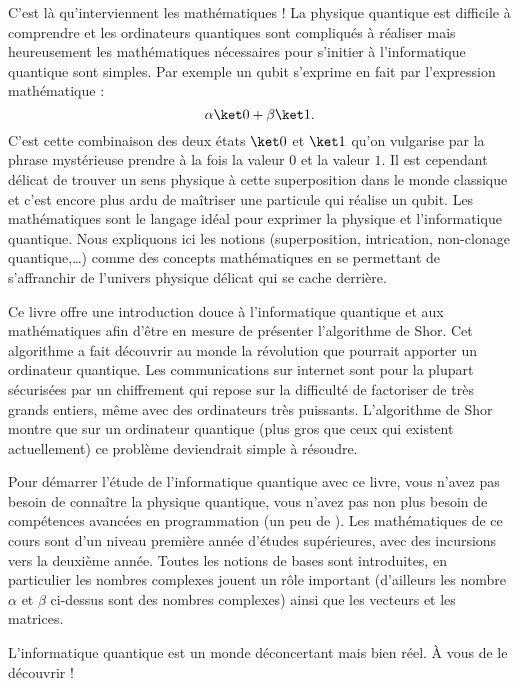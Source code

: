 \medskip

C'est là qu'interviennent les mathématiques ! La physique quantique est difficile à comprendre et les ordinateurs quantiques sont compliqués à réaliser mais heureusement les mathématiques nécessaires pour s'initier à l'informatique quantique sont simples.
Par exemple un qubit s'exprime en fait par l'expression mathématique :
$$\alpha\ket0 + \beta\ket1.$$
C'est cette combinaison des deux états $\ket0$ et $\ket1$ qu'on vulgarise par la phrase mystérieuse \og{}prendre à la fois la valeur $0$ et la valeur $1$\fg{}. Il est cependant délicat de trouver un sens physique à cette superposition dans le monde classique et c'est encore plus ardu de maîtriser une particule qui réalise un qubit.  
Les mathématiques sont le langage idéal pour exprimer la physique et l'informatique quantique. Nous expliquons ici les notions (superposition, intrication, non-clonage quantique,\ldots{}) comme des concepts mathématiques en se permettant de s'affranchir de l'univers physique délicat qui se cache derrière.

\medskip

Ce livre offre une introduction douce à l'informatique quantique et aux mathématiques afin d'être en mesure de présenter l'algorithme de Shor. Cet algorithme a fait découvrir au monde la révolution que pourrait apporter un ordinateur quantique. Les communications sur internet sont pour la plupart sécurisées par un chiffrement qui repose sur la difficulté de factoriser de très grands entiers, même avec des ordinateurs très puissants. L'algorithme de Shor montre que sur un ordinateur quantique (plus gros que ceux qui existent actuellement) ce problème deviendrait simple à résoudre.

\medskip

Pour démarrer l'étude de l'informatique quantique avec ce livre, vous n'avez pas besoin de connaître la physique quantique, vous n'avez pas non plus besoin de compétences avancées en programmation (un peu de \Python).
Les mathématiques de ce cours sont d'un niveau première année d'études supérieures, avec des incursions vers la deuxième année. Toutes les notions de bases sont introduites, en particulier les nombres complexes jouent un rôle important (d'ailleurs les nombre $\alpha$ et $\beta$ ci-dessus sont des nombres complexes) ainsi que les vecteurs et les matrices.

L'informatique quantique est un monde déconcertant mais bien réel. À vous de le découvrir !


